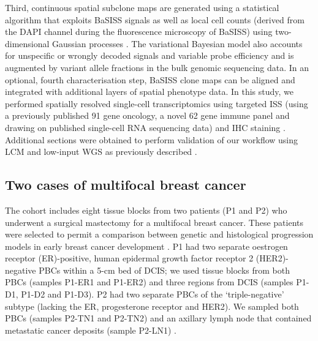 Third, continuous spatial subclone maps are generated using a statistical algorithm that exploits \ac{BaSISS} signals as well as local cell counts (derived from the DAPI channel during the fluorescence microscopy of \ac{BaSISS}) using two-dimensional Gaussian processes . The variational Bayesian model also accounts for unspecific or wrongly decoded signals and variable probe efficiency and is augmented by variant allele fractions in the bulk genomic sequencing data. In an optional, fourth characterisation step, \ac{BaSISS} clone maps can be aligned and integrated with additional layers of spatial phenotype data. In this study, we performed spatially resolved single-cell transcriptomics using targeted \ac{ISS} (using a previously published 91 gene oncology, a novel 62 gene immune panel and drawing on published single-cell RNA sequencing data) \parencite{Svedlund2019-xb,Wu2021-uq} and \acf{IHC} staining . Additional sections were obtained to perform validation of our workflow using \ac{LCM} and low-input \ac{WGS} as previously described \parencite{Ellis2021-du} .

\subsection{Two cases of multifocal breast cancer}
\label{sec:applications-cohort-introduction}
The cohort includes eight tissue blocks from two patients (P1 and P2) who underwent a surgical mastectomy for a multifocal breast cancer. These patients were selected to permit a comparison between genetic and histological progression models in early breast cancer development \parencite{Cowell2013-du} . P1 had two separate oestrogen receptor (ER)-positive, human epidermal growth factor receptor 2 (HER2)-negative \acfp{PBC} within a 5-cm bed of \ac{DCIS}; we used tissue blocks from both \acp{PBC} (samples P1-ER1 and P1-ER2) and three regions from \ac{DCIS} (samples P1-D1, P1-D2 and P1-D3). P2 had two separate PBCs of the `triple-negative' subtype (lacking the ER, progesterone receptor and HER2). We sampled both PBCs (samples P2-TN1 and P2-TN2) and an axillary lymph node that contained metastatic cancer deposits (sample P2-LN1) .


